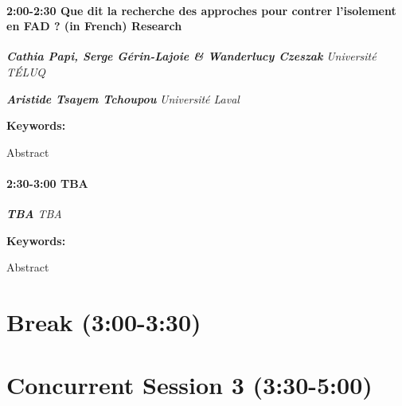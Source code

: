 \documentclass[
]{book}
\begin{document}
\begin{session}
\hypertarget{que-dit-la-recherche-des-approches-pour-contrer-lisolement-en-fad-in-french-research}{%
\paragraph*{\texorpdfstring{2:00-2:30 \textbar{} \textbf{Que dit la
recherche des approches pour contrer l'isolement en FAD ? (in French)}
\textbar{}
Research}{2:00-2:30 \textbar{} Que dit la recherche des approches pour contrer l'isolement en FAD ? (in French) \textbar{} Research}}\label{que-dit-la-recherche-des-approches-pour-contrer-lisolement-en-fad-in-french-research}}

\textbf{\emph{Cathia Papi, Serge Gérin-Lajoie \& Wanderlucy Czeszak}}
\textbar{} \emph{Université TÉLUQ}

\textbf{\emph{Aristide Tsayem Tchoupou}} \textbar{} \emph{Université
Laval}

\textbf{Keywords:}

Abstract
\end{session}
\begin{session}
\hypertarget{tba}{%
\paragraph*{\texorpdfstring{2:30-3:00 \textbar{} \textbf{TBA}
\textbar{}}{2:30-3:00 \textbar{} TBA \textbar{}}}\label{tba}}

\textbf{\emph{TBA}} \textbar{} \emph{TBA}

\textbf{Keywords:}

Abstract
\end{session}

\hypertarget{break-300-330}{%
\section*{Break (3:00-3:30)}\label{break-300-330}}

\hypertarget{concurrent-session-3-330-500}{%
\section*{Concurrent Session 3 (3:30-5:00)}\label{concurrent-session-3-330-500}}
\end{document}
